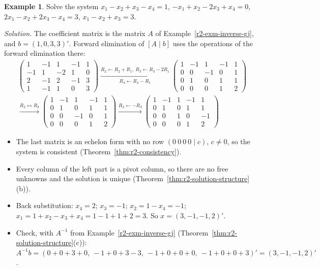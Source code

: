 \documentclass[12pt]{article}
\theoremstyle{definition}
\newtheorem{example}[theorem]{Example}
\begin{document}
\begin{example}\label{r2-exm-unique}
Solve the system
\(x_1-x_2+x_3-x_4=1\), \(-x_1+x_2-2x_3+x_4=0\), \(2x_1-x_2+2x_3-x_4=3\), \(x_1-x_2+x_3=3\).

\textit{Solution.} The coefficient matrix is the matrix \(A\) of
Example~\ref{r2-exm-inverse-gj}, and \(b=(1,0,3,3)'\). Forward elimination of \([A\mid b]\)
uses the operations of the forward elimination there:
\[
\begin{gathered}
\left(\begin{array}{cccc|c}1&-1&1&-1&1\\-1&1&-2&1&0\\2&-1&2&-1&3\\1&-1&1&0&3\end{array}\right)
\xrightarrow[R_4\leftarrow R_4-R_1]{R_2\leftarrow R_2+R_1,\ R_3\leftarrow R_3-2R_1}
\left(\begin{array}{cccc|c}1&-1&1&-1&1\\0&0&-1&0&1\\0&1&0&1&1\\0&0&0&1&2\end{array}\right)
\\
\xrightarrow{R_2\leftrightarrow R_3}
\left(\begin{array}{cccc|c}1&-1&1&-1&1\\0&1&0&1&1\\0&0&-1&0&1\\0&0&0&1&2\end{array}\right)
\xrightarrow{R_3\leftarrow-R_3}
\left(\begin{array}{cccc|c}1&-1&1&-1&1\\0&1&0&1&1\\0&0&1&0&-1\\0&0&0&1&2\end{array}\right)
\end{gathered}
\]
\begin{itemize}
\item The last matrix is an echelon form with no row \((0\ 0\ 0\ 0\mid c)\), \(c\ne0\), so the
system is consistent (Theorem~\ref{thm:r2-consistency}).
\item Every column of the left part is a pivot column, so there are no free unknowns and the
solution is unique (Theorem~\ref{thm:r2-solution-structure}(b)).
\item Back substitution: \(x_4=2\); \(x_3=-1\); \(x_2=1-x_4=-1\);
\(x_1=1+x_2-x_3+x_4=1-1+1+2=3\). So \(x=(3,-1,-1,2)'\).
\item Check, with \(A^{-1}\) from Example~\ref{r2-exm-inverse-gj}
(Theorem~\ref{thm:r2-solution-structure}(c)):
\(A^{-1}b=(0+0+3+0,\ -1+0+3-3,\ -1+0+0+0,\ -1+0+0+3)'=(3,-1,-1,2)'\).
\end{itemize}
\end{example}
\end{document}
